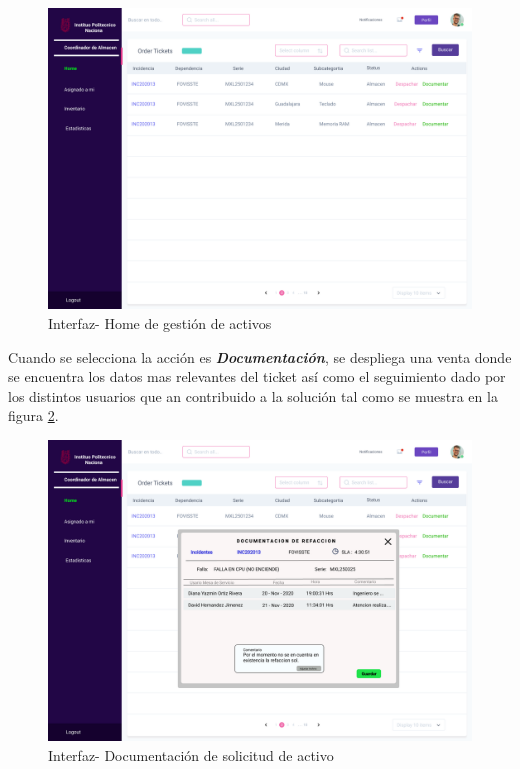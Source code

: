 	\begin{figure}[H]
	\centering
	\includegraphics[width=1.1\textwidth]{Capitulo4/Img/GestionAc/Home}
	\caption{Interfaz- Home de gestión de activos}
	\label{fig:HOGDAAL}
\end{figure}



Cuando se selecciona la acción es \textbf{\textit{Documentación}}, se despliega una venta donde se encuentra los datos mas relevantes del ticket así como el seguimiento dado por los distintos usuarios que an contribuido a la solución tal como se muestra en la figura \ref{fig:DODACTICVOS}.

\begin{figure}[H]
	\centering
	\includegraphics[width=1.1\textwidth]{Capitulo4/Img/GestionAc/Almacen-Doc}
	\caption{Interfaz- Documentación de solicitud de activo }
	\label{fig:DODACTICVOS}
\end{figure}

